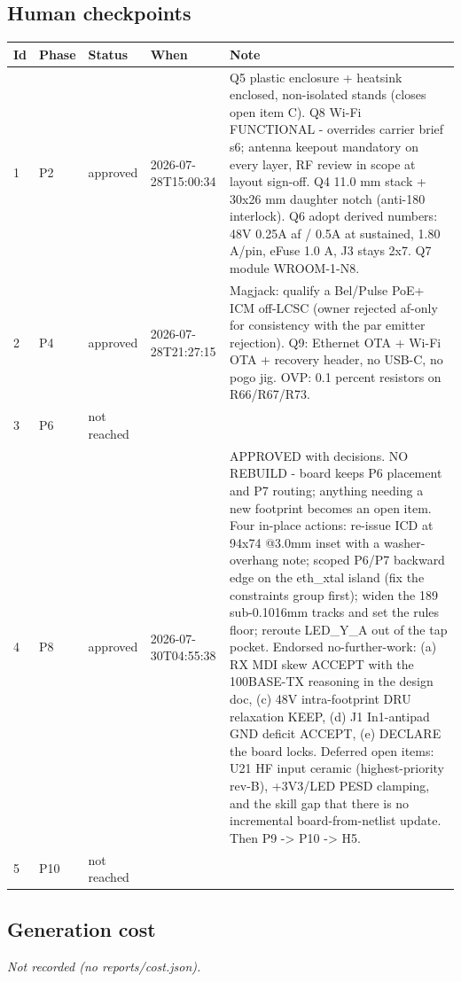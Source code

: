 \documentclass[11pt,a4paper]{article}
\begin{document}
\subsection*{Human checkpoints}
{\small
\begin{longtable}{lllp{2.6cm}p{6.4cm}}
\toprule
\textbf{Id} & \textbf{Phase} & \textbf{Status} & \textbf{When} & \textbf{Note} \\
\midrule
\endhead
1 & P2 & approved & 2026-07-28T15:00:34 & Q5 plastic enclosure + heatsink enclosed, non-isolated stands (closes open item C). Q8 Wi-Fi FUNCTIONAL - overrides carrier brief s6; antenna keepout mandatory on every layer, RF review in scope at layout sign-off. Q4 11.0 mm stack + 30x26 mm daughter notch (anti-180 interlock). Q6 adopt derived numbers: 48V 0.25A af / 0.5A at sustained, 1.80 A/pin, eFuse 1.0 A, J3 stays 2x7. Q7 module WROOM-1-N8. \\
2 & P4 & approved & 2026-07-28T21:27:15 & Magjack: qualify a Bel/Pulse PoE+ ICM off-LCSC (owner rejected af-only for consistency with the par emitter rejection). Q9: Ethernet OTA + Wi-Fi OTA + recovery header, no USB-C, no pogo jig. OVP: 0.1 percent resistors on R66/R67/R73. \\
3 & P6 & not reached &  &  \\
4 & P8 & approved & 2026-07-30T04:55:38 & APPROVED with decisions. NO REBUILD - board keeps P6 placement and P7 routing; anything needing a new footprint becomes an open item. Four in-place actions: re-issue ICD at 94x74 @3.0mm inset with a washer-overhang note; scoped P6/P7 backward edge on the eth\_xtal island (fix the constraints group first); widen the 189 sub-0.1016mm tracks and set the rules floor; reroute LED\_Y\_A out of the tap pocket. Endorsed no-further-work: (a) RX MDI skew ACCEPT with the 100BASE-TX reasoning in the design doc, (c) 48V intra-footprint DRU relaxation KEEP, (d) J1 In1-antipad GND deficit ACCEPT, (e) DECLARE the board locks. Deferred open items: U21 HF input ceramic (highest-priority rev-B), +3V3/LED PESD clamping, and the skill gap that there is no incremental board-from-netlist update. Then P9 -\textgreater{} P10 -\textgreater{} H5. \\
5 & P10 & not reached &  &  \\
\bottomrule
\end{longtable}
}
\subsection*{Generation cost}
\emph{Not recorded (no reports/cost.json).}
\end{document}
